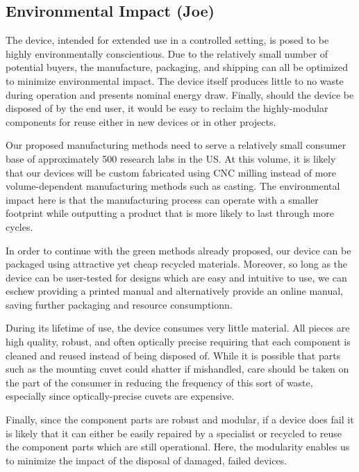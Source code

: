 \documentclass{article}
\begin{document}
\subsection{Environmental Impact (Joe)}
\label{sec:environment}
 
The device, intended for extended use in a controlled setting, is
posed to be highly environmentally conscientious. Due to the
relatively small number of potential buyers, the manufacture,
packaging, and shipping can all be optimized to minimize environmental
impact. The device itself produces little to no waste during operation
and presents nominal energy draw. Finally, should the device be
disposed of by the end user, it would be easy to reclaim the
highly-modular components for reuse either in new devices or in other
projects.
 
Our proposed manufacturing methods need to serve a relatively small
consumer base of approximately 500 research labs in the US. At this volume,
it is likely that our devices will be custom fabricated using CNC
milling instead of more volume-dependent manufacturing methods such as
casting. The environmental impact here is that the manufacturing
process can operate with a smaller footprint while outputting a
product that is more likely to last through more cycles.
 
In order to continue with the green methods already proposed, our
device can be packaged using attractive yet cheap recycled
materials. Moreover, so long as the device can be user-tested for
designs which are easy and intuitive to use, we can eschew providing a
printed manual and alternatively provide an online manual, saving
further packaging and resource consumptionn.
 
During its lifetime of use, the device consumes very little
material. All pieces are high quality, robust, and often optically
precise requiring that each component is cleaned and reused instead of
being disposed of. While it is possible that parts such as the
mounting cuvet could shatter if mishandled, care should be taken on
the part of the consumer in reducing the frequency of this sort of
waste, especially since optically-precise cuvets are expensive.
 
Finally, since the component parts are robust and modular, if a device
does fail it is likely that it can either be easily repaired by a
specialist or recycled to reuse the component parts which are still
operational. Here, the modularity enables us to minimize the impact of
the disposal of damaged, failed devices.
 
\end{document}
